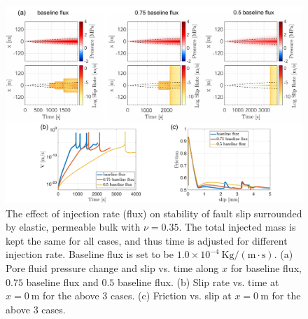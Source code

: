 \begin{figure}[htbp]
    \centering
    \includegraphics[width=1.0\textwidth]{figures/flux_elast_0.35.pdf}
    \caption{The effect of injection rate (flux) on stability of fault slip surrounded by elastic, permeable bulk with $\nu = 0.35$. 
    The total injected mass is kept the same for all cases, 
    and thus time is adjusted for different injection rate. 
    Baseline flux is set to be $1.0\times10^{-4}\ \mathrm{Kg / (m \cdot s)}$.
    (a) Pore fluid pressure change and slip vs. time along $x$ for baseline flux, $0.75$ baseline flux and $0.5$ baseline flux. 
    (b) Slip rate vs. time at $x = 0\ \mathrm{m}$ for the above 3 cases. 
    (c) Friction vs. slip at $x = 0\ \mathrm{m}$ for the above 3 cases.}
    \label{fig:fluxElas0.35}
\end{figure}